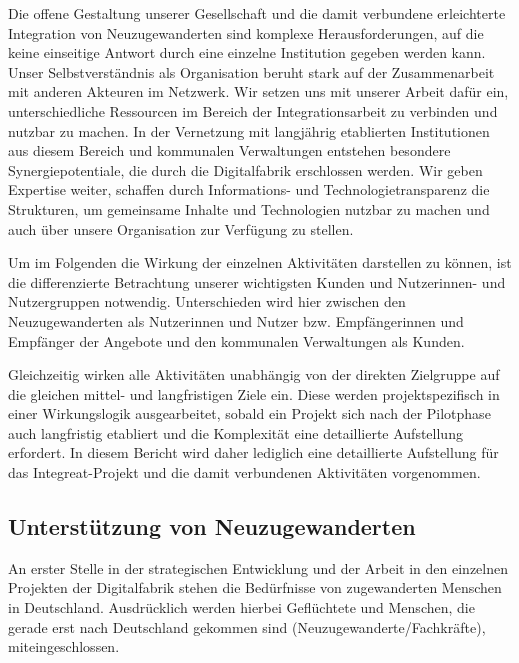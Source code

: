 \documentclass[12pt, a4paper]{article} %
\begin{document}
Die offene Gestaltung unserer Gesellschaft und die damit verbundene
erleichterte Integration von Neuzugewanderten sind komplexe
Herausforderungen, auf die keine einseitige Antwort durch eine einzelne
Institution gegeben werden kann. Unser Selbstverständnis als
Organisation beruht stark auf der Zusammenarbeit mit anderen Akteuren im
Netzwerk. Wir setzen uns mit unserer Arbeit dafür ein, unterschiedliche
Ressourcen im Bereich der Integrationsarbeit zu verbinden und nutzbar zu
machen. In der Vernetzung mit langjährig etablierten Institutionen aus
diesem Bereich und kommunalen Verwaltungen entstehen besondere
Synergiepotentiale, die durch die Digitalfabrik erschlossen werden. Wir
geben Expertise weiter, schaffen durch Informations- und
Technologietransparenz die Strukturen, um gemeinsame Inhalte und
Technologien nutzbar zu machen und auch über unsere Organisation zur
Verfügung zu stellen.

Um im Folgenden die Wirkung der einzelnen Aktivitäten darstellen zu
können, ist die differenzierte Betrachtung unserer wichtigsten Kunden
und Nutzerinnen- und Nutzergruppen notwendig. Unterschieden wird hier
zwischen den Neuzugewanderten als Nutzerinnen und Nutzer bzw.
Empfängerinnen und Empfänger der Angebote und den kommunalen
Verwaltungen als Kunden.

Gleichzeitig wirken alle Aktivitäten unabhängig von der direkten
Zielgruppe auf die gleichen mittel- und langfristigen Ziele ein. Diese
werden projektspezifisch in einer Wirkungslogik ausgearbeitet, sobald
ein Projekt sich nach der Pilotphase auch langfristig etabliert und die
Komplexität eine detaillierte Aufstellung erfordert. In diesem Bericht
wird daher lediglich eine detaillierte Aufstellung für das
Integreat-Projekt und die damit verbundenen Aktivitäten vorgenommen.

\hypertarget{unterstuxfctzung-von-neuzugewanderten}{%
\subsection{Unterstützung von
Neuzugewanderten}\label{unterstuxfctzung-von-neuzugewanderten}}

An erster Stelle in der strategischen Entwicklung und der Arbeit in den
einzelnen Projekten der Digitalfabrik stehen die Bedürfnisse von
zugewanderten Menschen in Deutschland. Ausdrücklich werden hierbei
Geflüchtete und Menschen, die gerade erst nach Deutschland gekommen sind
(Neuzugewanderte/Fachkräfte), miteingeschlossen.
\end{document}
